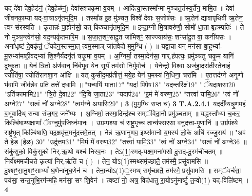 \documentclass[17pt]{extarticle}
\begin{document}
                  यद्-दे॑वा देव॒हेड॑नं॒ (देव॒हेळ॑नं॒) देवा॑सश्चकृ॒मा व॒यम् ।  आदि॑त्या॒स्तस्मा᳚न्मा मुञ्चत॒र्तस्य॒र्तेन॒ मामि॒त ॥  देवा॑ जीवनका॒म्या यद्-वा॒चाऽनृ॑तमूदि॒म ।  तस्मा᳚न्न इ॒ह मु॑ञ्चत॒ विश्वे॑ देवाः स॒जोष॑सः ॥  ऋ॒तेन॑ द्यावापृथिवी ऋ॒तेन॒ त्वꣳ स॑रस्वति ।  कृ॒तान्नः॑ पा॒ह्येन॑सो॒ यत् किञ्चानृ॑तमूदि॒म ॥  इ॒न्द्रा॒ग्नी मि॒त्रावरु॑णौ॒ सोमो॑ धा॒ता बृह॒स्पतिः॑ ।  ते नो॑ मुञ्च॒न्त्वेन॑सो॒ यद॒न्यकृ॑तमारि॒म ॥  स॒जा॒त॒शꣳ॒॒सादु॒त जा॑मिशꣳ॒॒ साज्ज्याय॑सः॒ शꣳसा॑दु॒त वा॒ कनी॑यसः ।  अना॑धृष्टं दे॒वकृ॑तं॒ ॅयदेन॒स्तस्मा॒त् त्वम॒स्माञ् जा॑तवेदो मुमुग्धि ( ) ॥  यद्वा॒चा यन् मन॑सा बा॒हुभ्या॑-मू॒रुभ्या॑मष्ठी॒वद्भ्या॑ शि॒श्नैर्यदनृ॑तं चकृ॒मा व॒यम् ।  अ॒ग्निर्मा॒ तस्मा॒देन॑सा॒ गार्.ह॑पत्यः॒ प्रमु॑ञ्चतु चकृ॒म यानि॑ दुष्कृ॒ता ॥  येन॑ त्रि॒तो अ॑र्ण॒वान् नि॑र्ब॒भूव॒ येन॒ सूर्यं॒ तम॑सो निर्मु॒मोच॑ ।  येनेन्द्रो॒ विश्वा॒ अज॑हा॒दरा॑ती॒स्तेना॒हं ज्योति॑षा॒ ज्योति॑रानशा॒न आ᳚क्षि ॥  यत् कुसी॑द॒मप्र॑तीत्तं॒ मये॒ह येन॑ य॒मस्य॑ नि॒धिना॒ चरा॑मि ।  ए॒तत्तद॑ग्ने अनृ॒णो भ॑वामि॒ जीव॑न्ने॒व प्रति॒ तत्ते॑ दधामि ॥  "यन्मयि॑ मा॒ता{17}" "यदा॑ पि॒पेष॒{18}" "यद॒न्तरि॑क्षं॒{19}"  " ॅयदा॒शसा{20} "ऽति॑क्रामामि{21}" "त्रि॒ते दे॒वा{22}"  "दि॒वि जा॒ता{23}" "यदाप॑{24}" "इ॒मं मे॑ वरुण॒{25}"  "तत्त्वा॑ यामि॒{26}" "त्वं नो॑ अग्ने॒{27}" "सत्वं नो॑ अग्ने॒{28}" "त्वम॑ग्ने अ॒यासि॑{29}"। \textbf{ 3} \newline
                  \newline
                                                        (मु॒मु॒ग्धि॒ स॒प्त च॑) \textbf{3} \newline \newline
                                \textbf{ T.A.2.4.1} \newline
                  यददी᳚व्यन्नृ॒णम॒हं ब॒भूवादि॑थ् सन्वा संज॒गर॒ जने᳚भ्यः । अ॒ग्निर्मा॒ तस्मा॒दिन्द्र॑श्च सम्ॅविदा॒नौ प्रमु॑ञ्चताम् ॥ यद्धस्ता᳚भ्यां च॒कर॒ किल्बि॑षाण्य॒क्षाणां᳚ ॅव॒ग्नुमु॑प॒जिघ्न॑मानः ।  उ॒ग्र॒म्प॒श्या च॑ राष्ट्र॒भृच्च॒ तान्य॑फ्स॒रसा॒ वनु॑दत्ता-मृ॒णानि॑ ॥ उग्र॑पंश्ये॒ राष्ट्र॑भृ॒त् किल्बि॑षाणि॒ यद॒क्षवृ॑त्त॒मनु॑दत्तमे॒तत् ।  नेन्न॑ ऋ॒णानृ॒णव॒ इथ्स॑मानो य॒मस्य॑ लो॒के अधि॑ रज्जु॒राय॑ ॥ "अव॑ ते॒ हेड॒ (हेळ॒)  {30}" "उदु॑त्त॒म{31}" "मि॒मं मे॑ वरुण॒{32}"  "तत्त्वा॑ यामि॒{33}" "त्वं नो॑ अग्ने॒{34}" "सत्वं नो॑ अग्ने{36} ॥ संकु॑सुको॒ विकु॑सुको निर्.ऋ॒थो यश्च॑ निस्व॒नः । तेऽ(1॒)स्मद्-यक्ष्म॒मना॑गसो दू॒राद्-दू॒रम॑चीचतम् ॥ निर्य॑क्ष्ममचीचते कृ॒त्यां निर्.ऋ॑तिं च ( ) । तेन॒ योऽ(1॒)स्मथ्समृ॑च्छातै॒ तम॑स्मै॒ प्रसु॑वामसि ॥ दु॒श्शꣳ॒॒सा॒नु॒शꣳ॒॒साभ्यां᳚ घ॒णेना॑नुघ॒णेन॑ च । तेना॒न्योऽ(1)॒स्मथ् समृ॑च्छातै॒ तम॑स्मै॒ प्रसु॑वामसि ॥  सम्ॅवर्च॑सा॒ पय॑सा॒ सन्त॒नूभि॒रग॑न्महि॒ मन॑सा॒ सꣳ शि॒वेन॑ । त्वष्टा॑ नो॒ अत्र॒ विद॑धातु रा॒योऽनु॑मार्ष्टु त॒न्वो(1॒) यद्-विलि॑ष्टम् । \textbf{ 4} \newline
\end{document}
